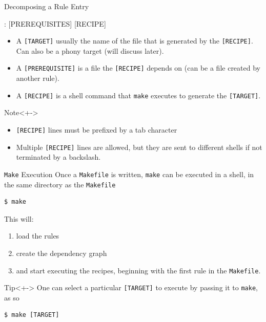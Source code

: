 \documentclass[10pt]{beamer}
\newcommand{\textco}[1]{\colorbox{bg_gray}{\texttt{#1}}}
\begin{document}
\begin{frame}[fragile]{Decomposing a Rule Entry}
\begin{makefile}
[TARGET]: [PREREQUISITES]
    [RECIPE]
\end{makefile}
  \begin{itemize}
    \item<+-> A \textco{[TARGET]} usually the name of the file that is generated by
      the \textco{[RECIPE]}. Can also be a phony target (will discuss later).\\

    \item<+-> A \textco{[PREREQUISITE]} is a file the \textco{[RECIPE]} depends
      on (can be a file created by another rule).\\

    \item<+-> A \textco{[RECIPE]} is a shell command that \textco{make} executes
      to generate the \textco{[TARGET]}.

  \end{itemize}

  \begin{alertblock}{Note}<+->
    \begin{itemize}
    \item \textco{[RECIPE]} lines must be prefixed by a tab character
    \item Multiple \textco{[RECIPE]} lines are allowed, but they are sent to different shells if
        not terminated by a backslash.
    \end{itemize}
  \end{alertblock}
\end{frame}


\begin{frame}[fragile]{\texttt{Make} Execution}
  Once a \textco{Makefile} is written, \textco{make} can be executed in a shell,
  in the same directory as the \textco{Makefile}
  \begin{lstlisting}
$ make
\end{lstlisting}
  This will:
  \begin{enumerate}[<+->]
  \item load the rules
  \item create the dependency graph
    \item and start executing the
      recipes, beginning with the first rule in the \textco{Makefile}.
    \end{enumerate}

  \begin{exampleblock}{Tip}<+->
  One can select a particular \textco{[TARGET]} to execute by passing it to
  \textco{make}, as so
\begin{lstlisting}
$ make [TARGET]
\end{lstlisting}
\end{exampleblock}

\end{frame}
\end{document}

